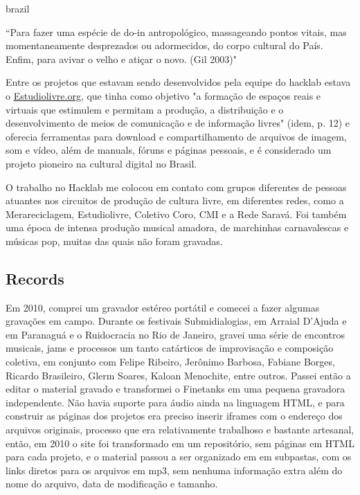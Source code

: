 \begin{otherlanguage*}{brazil}
\begin{citacao}
``Para fazer uma espécie de do-in antropológico, massageando pontos vitais, mas momentaneamente desprezados ou adormecidos, do corpo cultural do País. Enfim, para avivar o velho e atiçar o novo. (Gil 2003)" 
\end{citacao}


Entre os projetos que estavam sendo desenvolvidos pela equipe do hacklab estava o \url{Estudiolivre.org}, que tinha como objetivo "a formação de espaços reais e virtuais que estimulem e permitam a produção, a distribuição e o desenvolvimento de meios de comunicação e de informação livres" (idem, p. 12) e oferecia ferramentas para download e compartilhamento de arquivos de imagem, som e vídeo, além de manuals, fóruns e páginas pessoais, e é considerado um projeto pioneiro na cultural digital no Brasil. 

O trabalho no Hacklab me colocou em contato com grupos diferentes de pessoas atuantes nos circuitos de produção de cultura livre, em diferentes redes, como a Merareciclagem, Estudiolivre, Coletivo Coro, CMI e a Rede Saravá. Foi também uma época de intensa produção musical amadora, de marchinhas carnavalescas e músicas pop, muitas das quais não foram gravadas. 


\subsection{Records}
Em 2010, comprei um gravador estéreo portátil e comecei a fazer algumas gravações em campo. Durante os festivais Submidialogias, em Arraial D'Ajuda e em Paranaguá e o Ruidocracia no Rio de Janeiro, gravei uma série de encontros musicais, jams e processos um tanto catárticos de improvisação e composição coletiva, em conjunto com Felipe Ribeiro, Jerônimo Barbosa, Fabiane Borges, Ricardo Brasileiro, Glerm Soares, Kaloan Menochite, entre outros. Passei então a editar o material gravado e transformei o Finetanks em uma pequena gravadora independente. Não havia suporte para áudio ainda na linguagem HTML, e para construir as páginas dos projetos era preciso inserir iframes com o endereço dos arquivos originais, processo que era relativamente trabalhoso e bastante artesanal, então, em 2010 o site foi transformado em um repositório, sem páginas em HTML para cada projeto, e o material passou a ser organizado em em subpastas, com os links diretos para os arquivos em mp3, sem nenhuma informação extra além do nome do arquivo, data de modificação e tamanho. 


\end{otherlanguage*}
